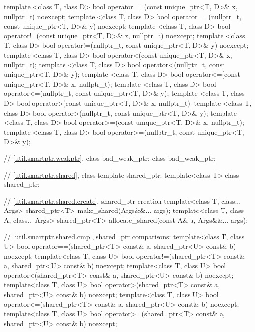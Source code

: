 \begin{codeblock}
{  template <class T, class D>
    bool operator==(const unique_ptr<T, D>& x, nullptr_t) noexcept;
  template <class T, class D>
    bool operator==(nullptr_t, const unique_ptr<T, D>& y) noexcept;
  template <class T, class D>
    bool operator!=(const unique_ptr<T, D>& x, nullptr_t) noexcept;
  template <class T, class D>
    bool operator!=(nullptr_t, const unique_ptr<T, D>& y) noexcept;
  template <class T, class D>
    bool operator<(const unique_ptr<T, D>& x, nullptr_t);
  template <class T, class D>
    bool operator<(nullptr_t, const unique_ptr<T, D>& y);
  template <class T, class D>
    bool operator<=(const unique_ptr<T, D>& x, nullptr_t);
  template <class T, class D>
    bool operator<=(nullptr_t, const unique_ptr<T, D>& y);
  template <class T, class D>
    bool operator>(const unique_ptr<T, D>& x, nullptr_t);
  template <class T, class D>
    bool operator>(nullptr_t, const unique_ptr<T, D>& y);
  template <class T, class D>
    bool operator>=(const unique_ptr<T, D>& x, nullptr_t);
  template <class T, class D>
    bool operator>=(nullptr_t, const unique_ptr<T, D>& y);

  // \ref{util.smartptr.weakptr}, class bad_weak_ptr:
  class bad_weak_ptr;

  // \ref{util.smartptr.shared}, class template shared_ptr:
  template<class T> class shared_ptr;

  // \ref{util.smartptr.shared.create}, shared_ptr creation
  template<class T, class... Args> shared_ptr<T> make_shared(Args&&... args);
  template<class T, class A, class... Args>
    shared_ptr<T> allocate_shared(const A& a, Args&&... args);

  // \ref{util.smartptr.shared.cmp}, shared_ptr comparisons:
  template<class T, class U>
    bool operator==(shared_ptr<T> const& a, shared_ptr<U> const& b) noexcept;
  template<class T, class U>
    bool operator!=(shared_ptr<T> const& a, shared_ptr<U> const& b) noexcept;
  template<class T, class U>
    bool operator<(shared_ptr<T> const& a, shared_ptr<U> const& b) noexcept;
  template<class T, class U>
    bool operator>(shared_ptr<T> const& a, shared_ptr<U> const& b) noexcept;
  template<class T, class U>
    bool operator<=(shared_ptr<T> const& a, shared_ptr<U> const& b) noexcept;
  template<class T, class U>
    bool operator>=(shared_ptr<T> const& a, shared_ptr<U> const& b) noexcept;

}
\end{codeblock}
